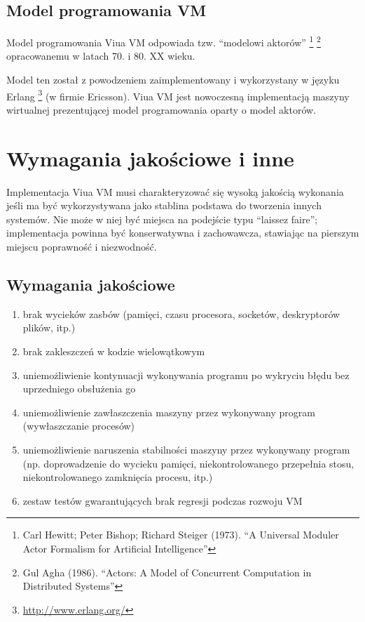 \documentclass[11pt,oneside,a4paper,titlepage,onecolumn]{article}
\begin{document}
\subsection{Model programowania VM}

Model programowania Viua VM odpowiada tzw. ``modelowi aktorów''
\footnote{Carl Hewitt; Peter Bishop; Richard Steiger (1973). ``A Universal Moduler Actor Formalism for
Artificial Intelligence''}
\footnote{Gul Agha (1986). ``Actors: A Model of Concurrent Computation in Distributed Systems''}
opracowanemu w latach 70. i 80. XX wieku.

Model ten został z powodzeniem zaimplementowany i wykorzystany w języku Erlang
\footnote{\url{http://www.erlang.org/}} (w firmie Ericsson).
Viua VM jest nowoczesną implementacją maszyny wirtualnej prezentującej model programowania oparty o model
aktorów.

\section{Wymagania jakościowe i inne}

Implementacja Viua VM musi charakteryzować się wysoką jakością wykonania jeśli ma być wykorzystywana jako
stablina podstawa do tworzenia innych systemów. Nie może w niej być miejsca na podejście typu ``laissez
faire''; implementacja powinna być konserwatywna i zachowawcza, stawiając na pierszym miejscu poprawność i
niezwodność.

\subsection{Wymagania jakościowe}

\begin{enumerate}
    \item brak wycieków zasbów (pamięci, czasu procesora, socketów, deskryptorów plików, itp.)
    \item brak zakleszczeń w kodzie wielowątkowym
    \item uniemożliwienie kontynuacji wykonywania programu po wykryciu błędu bez uprzedniego obsłużenia go
    \item uniemożliwienie zawłaszczenia maszyny przez wykonywany program (wywłaszczanie procesów)
    \item uniemożliwienie naruszenia stabilności maszyny przez wykonywany program (np. doprowadzenie do
        wycieku pamięci, niekontrolowanego przepełnia stosu, niekontrolowanego zamknięcia procesu, itp.)
    \item zestaw testów gwarantujących brak regresji podczas rozwoju VM
\end{enumerate}
\end{document}
